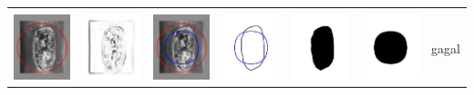 \begin{table}[H]
\begin{tabular}{|m{0.7in}|m{0.7in}|m{0.7in}|m{0.7in}|m{0.7in}|m{0.7in}|m{0.7in}|}
		&  &  & & & &  \\
		\includegraphics[width=0.7in]{dataset/dataset_3/luka_kuning/ready/10_integer_init.jpg}&
		\includegraphics[width=0.7in]{dataset/dataset_3/luka_kuning/ready/10_integer_ext.jpg}&
		\includegraphics[width=0.7in]{dataset/dataset_3/luka_kuning/ready/10_integer_result.jpg}&
		\includegraphics[width=0.7in]{dataset/dataset_3/luka_kuning/ready/10_gt_r_integer.jpg}&
		\includegraphics[width=0.7in]{dataset/dataset_3/luka_kuning/ready/10_r.jpg}&
		\includegraphics[width=0.7in]{dataset/dataset_3/luka_kuning/ready/10_integer_r.jpg}&
		gagal\\
		\hline
	\end{tabular}
\end{table}


